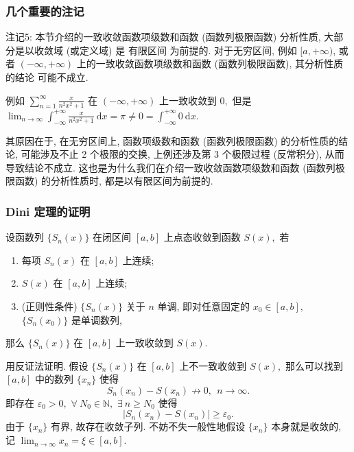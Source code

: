 
\begin{frame}
\frametitle{几个重要的注记}

{\color{red}} 注记5: 本节介绍的一致收敛函数项级数和函数 (函数列极限函数) 分析性质, 大部分是以收敛域 (或定义域) 是 \alert{有限区间} 为前提的. 对于无穷区间, 例如 $[a, +\infty)$, 或者 $(-\infty, +\infty)$ 上的一致收敛函数项级数和函数 (函数列极限函数), 其分析性质的结论 \alert{可能不成立}.

\pause
\vspace{0.5em}

例如 $\displaystyle \sum_{n=1}^\infty \frac{x}{n^2 x^2 + 1}$ 在 $(-\infty, +\infty)$ 上一致收敛到 $0,$ 但是 $\displaystyle \lim_{n\to\infty} \int_{-\infty}^{+\infty} \frac{x}{n^2 x^2 + 1} ~ \mathrm{d}x = \pi \neq 0 = \int_{-\infty}^{+\infty} 0 ~ \mathrm{d}x.$

\pause
\vspace{0.5em}

其原因在于, 在无穷区间上, 函数项级数和函数 (函数列极限函数) 的分析性质的结论, 可能涉及不止 2 个极限的交换, 上例还涉及第 3 个极限过程 (反常积分), 从而导致结论不成立. 这也是为什么我们在介绍一致收敛函数项级数和函数 (函数列极限函数) 的分析性质时, 都是以有限区间为前提的.

\end{frame}


\begin{frame}
\frametitle{Dini 定理的证明}

\begin{thm}[Dini 定理]
设函数列 $\{S_n(x)\}$ 在闭区间 $[a, b]$ 上点态收敛到函数 $S(x),$ 若
\begin{enumerate}
\item 每项 $S_n(x)$ 在 $[a, b]$ 上连续;
\item $S(x)$ 在 $[a, b]$ 上连续;
\item (\alert{正则性条件}) $\{S_n(x)\}$ 关于 $n$ 单调, 即对任意固定的 $x_0 \in [a, b],$ $\{S_n(x_0)\}$ 是单调数列,
\end{enumerate}
那么 $\{S_n(x)\}$ 在 $[a, b]$ 上一致收敛到 $S(x).$
\end{thm}

\pause

\startproof[bg=yellow, fg=red]
用反证法证明. 假设 $\{S_n(x)\}$ 在 $[a, b]$ 上不一致收敛到 $S(x),$ 那么可以找到 $[a, b]$ 中的数列 $\{x_n\}$ 使得
\[
S_n(x_n) - S(x_n) \nrightarrow 0, ~~ n \to \infty.
\]
即存在 $\varepsilon_0 > 0,$ $\forall ~ N_0 \in \mathbb{N},$ $\exists ~ n \geqslant N_0$ 使得
\[
\left| S_n(x_n) - S(x_n) \right| \geqslant \varepsilon_0.
\tag{$\dagger$}
\label{eq:dagger}
\]
由于 $\{x_n\}$ 有界, 故存在收敛子列. 不妨不失一般性地假设 $\{x_n\}$ 本身就是收敛的, 记 $\displaystyle \lim_{n\to\infty} x_n = \xi \in [a, b].$

\end{frame}


